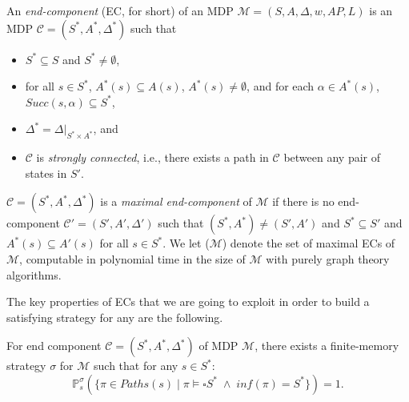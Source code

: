 
\begin{definition}
  An \textit{end-component} (EC, for short) of an MDP $\mathcal{M} = (S, A, \Delta, w, AP, L)$ is an MDP $\mathcal{C}=(S^*, A^*, \Delta^*)$ such that
  \begin{itemize}
    \item $S^* \subseteq S$ and $S^* \neq \emptyset$,
    \item for all $s \in S^*$, $A^*(s) \subseteq A(s)$, $A^*(s) \neq \emptyset$, and
      for each $\alpha \in A^*(s)$,
      $Succ(s, \alpha) \subseteq S^*$,
    \item $\Delta^* = \Delta |_{S^* \times A^*}$, and
    \item $\mathcal{C}$ is \textit{strongly connected}, i.e., there exists a path in $\mathcal{C}$ between any pair of states in $S'$.
  \end{itemize}
\end{definition}

\begin{definition}
$\mathcal{C}=(S^*, A^*, \Delta^*)$ is a \textit{maximal end-component} of $\mathcal{M}$ if there is no end-component
$\mathcal{C}'=(S', A', \Delta')$ such that $(S^*, A^*) \neq (S', A')$ and $S^* \subseteq S'$ and $A^*(s) \subseteq A'(s)$ for all $s \in S^*$.
We let \MEC{}($\mathcal{M}$) denote the set of maximal ECs of $\mathcal{M}$, computable in polynomial time in the size of $\mathcal{M}$ with purely graph theory algorithms.
\end{definition}
The key properties of ECs that we are going to exploit in order to build a satisfying strategy for any \MOSR{} are the following.
\begin{lemma}
  For end component $\mathcal{C}=(S^*, A^*, \Delta^*)$ of MDP $\mathcal{M}$, there exists a finite-memory strategy $\sigma$ for $\mathcal{M}$
  such that for any $s \in S^*$:
  \[
    \mathbb{P}^{\sigma}_s(\{ \pi \in Paths(s) \; | \; \pi \models \square S^* \; \wedge \; inf(\pi) = S^* \}) = 1.
  \]
\end{lemma}

